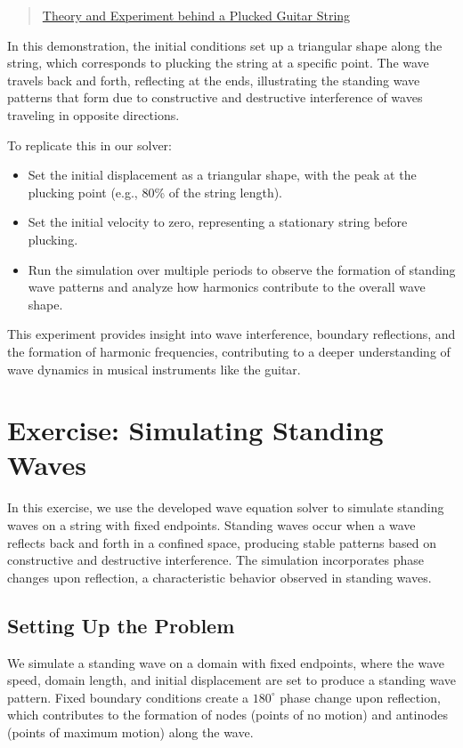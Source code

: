 \documentclass{article}
\begin{document}
			\begin{quote}
				\href{https://www.acs.psu.edu/drussell/Demos/Pluck-Fourier/Pluck-Fourier.html}{Theory and Experiment behind a Plucked Guitar String}
			\end{quote}
			
			In this demonstration, the initial conditions set up a triangular shape along the string, which corresponds to plucking the string at a specific point. The wave travels back and forth, reflecting at the ends, illustrating the standing wave patterns that form due to constructive and destructive interference of waves traveling in opposite directions.
			
			To replicate this in our solver:
			\begin{itemize}
				\item Set the initial displacement as a triangular shape, with the peak at the plucking point (e.g., 80\% of the string length).
				\item Set the initial velocity to zero, representing a stationary string before plucking.
				\item Run the simulation over multiple periods to observe the formation of standing wave patterns and analyze how harmonics contribute to the overall wave shape.
			\end{itemize}
			
			This experiment provides insight into wave interference, boundary reflections, and the formation of harmonic frequencies, contributing to a deeper understanding of wave dynamics in musical instruments like the guitar.
		
	 \section{Exercise: Simulating Standing Waves}
	 
		 In this exercise, we use the developed wave equation solver to simulate standing waves on a string with fixed endpoints. Standing waves occur when a wave reflects back and forth in a confined space, producing stable patterns based on constructive and destructive interference. The simulation incorporates phase changes upon reflection, a characteristic behavior observed in standing waves.
		 
		 \subsection{Setting Up the Problem}
		 
		 We simulate a standing wave on a domain with fixed endpoints, where the wave speed, domain length, and initial displacement are set to produce a standing wave pattern. Fixed boundary conditions create a \(180^\circ\) phase change upon reflection, which contributes to the formation of nodes (points of no motion) and antinodes (points of maximum motion) along the wave.
		 
\end{document}
